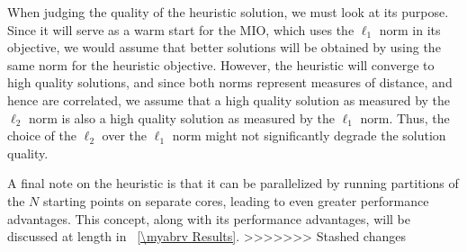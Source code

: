 When judging the quality of the heuristic solution, we must look at its purpose. Since it will serve as a warm start for the MIO, which uses the $\ell_1$ norm in its objective, we would assume that better solutions will be obtained by using the same norm for the heuristic objective. However, the heuristic will converge to high quality solutions, and since both norms represent measures of distance, and hence are correlated, we assume that a high quality solution as measured by the $\ell_2$ norm is also a high quality solution as measured by the $\ell_1$ norm. Thus, the choice of the $\ell_2$ over the $\ell_1$ norm might not significantly degrade the solution quality.


A final note on the heuristic is that it can be parallelized by running partitions of the $N$ starting points on separate cores, leading to even greater performance advantages. This concept, along with its performance advantages, will be discussed at length in \mysection~\ref{\myabrv Results}. 
>>>>>>> Stashed changes
